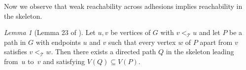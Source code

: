 \documentclass[1p,number,a4paper]{elsarticle}
\makeatletter
\theoremstyle{remark}
\newtheorem{claim}{$\rhd$ Claim}
\newcommand{\cqed}{\ensuremath{\lhd}}
\newenvironment{clproof}{\par
	\pushQED{\cqed}%
	\normalfont \topsep6\p@\@plus6\p@\relax
	\trivlist
	\item\relax
	{\itshape
		Proof of the claim\@addpunct{.}}\hspace\labelsep\ignorespaces
}{%
	\hfill\popQED\endtrivlist\@endpefalse
}
\newcommand{\Tt}{\mathcal{T}}
\newcommand{\adh}{\mathrm{Adh}}
\newcommand{\mrg}{\mathrm{Margin}}
\newcommand{\Sk}{\mathrm{Skeleton}}
\newtheorem{lemma}[theorem]{Lemma}
\makeatother
\begin{document}
\medskip

Now we observe that weak reachability across adhesions implies reachability in the skeleton.

\setcounter{claim}{0}

\begin{lemma}[Lemma 23 of \cite{pilipczuk2019polynomial}]\label{lem:path-skeleton}
Let $u,v$ be vertices of $G$ with $v<_{\Tt} u$ and let $P$ be a path in $G$ with endpoints $u$ and $v$ such that every vertex $w$ of $P$ apart from $v$ satisfies $v<_{\Tt} w$.
Then there exists a directed path $Q$ in the skeleton leading from~$u$ to~$v$ and satisfying $V(Q)\subseteq V(P)$.
\end{lemma}
%
%
%
\end{document}
